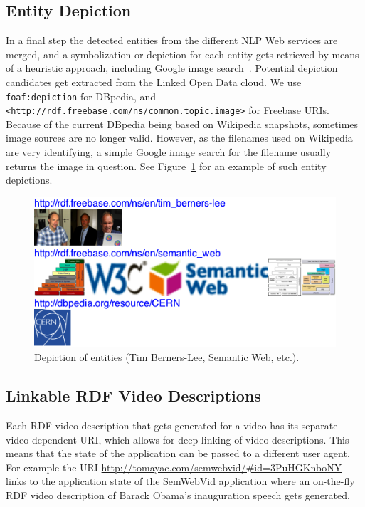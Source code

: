 \documentclass[12pt]{article}
\begin{document}
\subsection{Entity Depiction}\label{sec:depiction}
In a final step the detected entities from the different NLP Web services are merged, and a symbolization or depiction for each entity gets retrieved by means of a heuristic approach, including Google image search~\cite{googleimg}. Potential depiction candidates get extracted from the Linked Open Data cloud. We use \texttt{foaf:depiction} for DBpedia, and \texttt{<http://rdf.\-freebase.com\-/ns/common.topic.image>} for Freebase URIs. Because of the current DBpedia being based on Wikipedia snapshots, sometimes image sources are no longer valid. However, as the filenames used on Wikipedia are very identifying, a simple Google image search for the filename usually returns the image in question. See Figure~\ref{fig:depiction} for an example of such entity depictions.

\begin{figure}[htbp!]
\begin{center}
  \includegraphics[width=0.65\linewidth]{./resources/semwebvid-depiction.png}
    \caption{Depiction of entities (Tim Berners-Lee, Semantic Web, etc.).}
  \label{fig:depiction}
  \end{center}  
\end{figure}

\subsection{Linkable RDF Video Descriptions}
Each RDF video description that gets generated for a video has its separate video-dependent URI, which allows for deep-linking of video descriptions. This means that the state of the application can be passed to a different user agent. For example the URI \url{http://tomayac.com/semwebvid/#id=3PuHGKnboNY} links to the application state of the SemWebVid application where an on-the-fly RDF video description of Barack Obama's inauguration speech gets generated.
\end{document}
